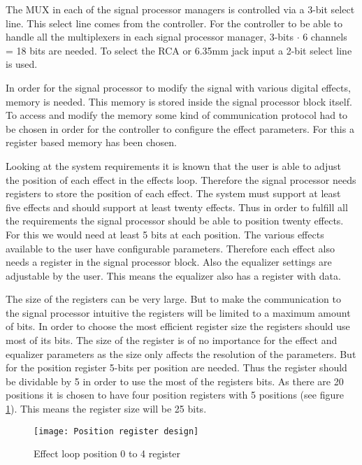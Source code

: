 The MUX in each of the signal processor managers is controlled via a 3-bit select line. This select line comes from the controller. For the controller to be able to handle all the multiplexers in each signal processor manager, 3-bits $\cdot$ 6 channels = 18 bits are needed. To select the RCA or 6.35mm jack input a 2-bit select line is used.

In order for the signal processor to modify the signal with various digital effects, memory is needed. This memory is stored inside the signal processor block itself. To access and modify the memory some kind of communication protocol had to be chosen in order for the controller to configure the effect parameters. For this a register based memory has been chosen.

Looking at the system requirements it is known that the user is able to adjust the position of each effect in the effects loop. Therefore the signal processor needs registers to store the position of each effect. The system must support at least five effects and should support at least twenty effects. Thus in order to fulfill all the requirements the signal processor should be able to position twenty effects. For this we would need at least 5 bits at each position. The various effects available to the user have configurable parameters. Therefore each effect also needs a register in the signal processor block. Also the equalizer settings are adjustable by the user. This means the equalizer also has a register with data.

The size of the registers can be very large. But to make the communication to the signal processor intuitive the registers will be limited to a maximum amount of bits. In order to choose the most efficient register size the registers should use most of its bits. The size of the register is of no importance for the effect and equalizer parameters as the size only affects the resolution of the parameters. But for the position register 5-bits per position are needed. Thus the register should be dividable by 5 in order to use the most of the registers bits. As there are 20 positions it is chosen to have four position registers with 5 positions (see figure \ref{fig:reg-position}).
This means the register size will be 25 bits.

\begin{figure}[ht]
    \centering
    \texttt{[image: Position register design]}
    \caption{Effect loop position 0 to 4 register}
    \label{fig:reg-position}
\end{figure}

